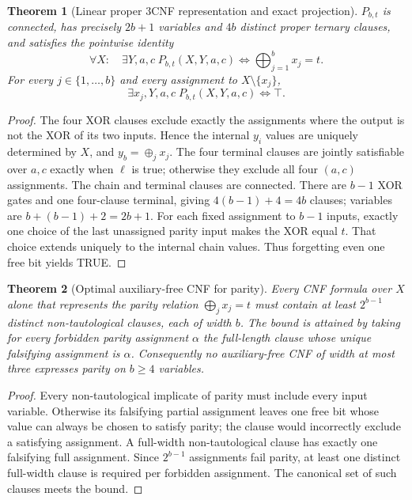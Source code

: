 \documentclass[11pt]{article}
\newtheorem{theorem}{Theorem}
\begin{document}
\begin{theorem}[Linear proper 3CNF representation and exact projection]\label{thm:parity}
$P_{b,t}$ is connected, has precisely $2b+1$ variables and $4b$ distinct proper ternary clauses, and satisfies the pointwise identity
\[
\boxed{\forall X:\quad \exists Y,a,c\;P_{b,t}(X,Y,a,c)
 \iff \bigoplus_{j=1}^{b}x_j=t.}
\]
For every $j\in\{1,\ldots,b\}$ and every assignment to $X\setminus\{x_j\}$,
\[
\boxed{\exists x_j,Y,a,c\;P_{b,t}(X,Y,a,c)\iff\top.}
\]
\end{theorem}
\begin{proof}
The four XOR clauses exclude exactly the assignments where the output is not the XOR of its two inputs. Hence the internal $y_i$ values are uniquely determined by $X$, and $y_b=\oplus_j x_j$. The four terminal clauses are jointly satisfiable over $a,c$ exactly when $\ell$ is true; otherwise they exclude all four $(a,c)$ assignments. The chain and terminal clauses are connected. There are $b-1$ XOR gates and one four-clause terminal, giving $4(b-1)+4=4b$ clauses; variables are $b+(b-1)+2=2b+1$. For each fixed assignment to $b-1$ inputs, exactly one choice of the last unassigned parity input makes the XOR equal $t$. That choice extends uniquely to the internal chain values. Thus forgetting even one free bit yields TRUE.\end{proof}

\begin{theorem}[Optimal auxiliary-free CNF for parity]\label{thm:noaux}
Every CNF formula over $X$ alone that represents the parity relation $\bigoplus_j x_j=t$ must contain at least $2^{b-1}$ distinct non-tautological clauses, each of width $b$. The bound is attained by taking for every forbidden parity assignment $\alpha$ the full-length clause whose unique falsifying assignment is $\alpha$. Consequently no auxiliary-free CNF of width at most three expresses parity on $b\ge4$ variables.
\end{theorem}
\begin{proof}
Every non-tautological implicate of parity must include every input variable. Otherwise its falsifying partial assignment leaves one free bit whose value can always be chosen to satisfy parity; the clause would incorrectly exclude a satisfying assignment. A full-width non-tautological clause has exactly one falsifying full assignment. Since $2^{b-1}$ assignments fail parity, at least one distinct full-width clause is required per forbidden assignment. The canonical set of such clauses meets the bound.\end{proof}
\end{document}
